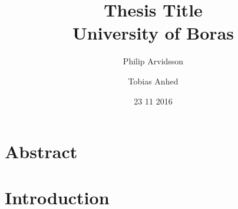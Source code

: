 \documentclass[12pt]{report}
\title{
  {Thesis Title}\\
  {\large University of Boras}\\
}
\author{Philip Arvidsson}
\author{Tobias Anhed}
\date{23 11 2016}
\begin{document}
    \maketitle

    \chapter*{Abstract}

    \tableofcontents
    \chapter{Introduction}
    
\end{document}
